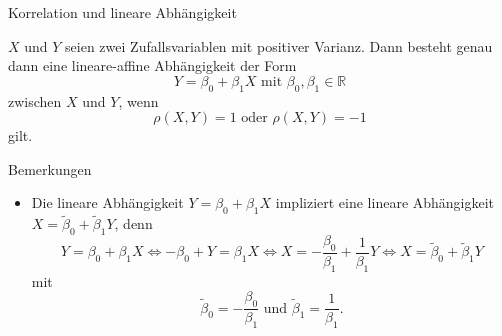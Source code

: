 \documentclass[
  8pt,
  ignorenonframetext,
]{beamer}
\providecommand{\tightlist}{%
  \setlength{\itemsep}{0pt}\setlength{\parskip}{0pt}}
\begin{document}
\begin{frame}{Korrelation und lineare Abhängigkeit}
\protect\hypertarget{korrelation-und-lineare-abhuxe4ngigkeit-1}{}
\small
\begin{theorem}
\justifying
\normalfont
$X$ und $Y$ seien zwei Zufallsvariablen mit positiver Varianz.  Dann besteht genau
dann eine lineare-affine Abhängigkeit der Form
\begin{equation}
Y = \beta_0 + \beta_1X \mbox{ mit } \beta_0,\beta_1\in \mathbb{R}
\end{equation}
zwischen $X$ und $Y$, wenn
\begin{equation}
\rho(X,Y) = 1 \mbox{ oder } \rho(X,Y) = -1
\end{equation}
gilt.
\end{theorem}

\footnotesize

Bemerkungen

\begin{itemize}
\tightlist
\item
  Die lineare Abhängigkeit \(Y = \beta_0 + \beta_1X\) impliziert eine
  lineare Abhängigkeit \(X = \tilde{\beta}_0 + \tilde{\beta}_1Y\), denn
  \begin{equation}
  Y = \beta_0 + \beta_1X
  \Leftrightarrow
  -\beta_0 + Y = \beta_1X
  \Leftrightarrow
  X = -\frac{\beta_0}{\beta_1} + \frac{1}{\beta_1}Y
  \Leftrightarrow
  X = \tilde{\beta}_0 + \tilde{\beta}_1 Y
  \end{equation} mit \begin{equation}
  \tilde{\beta}_0 = -\frac{\beta_0}{\beta_1} \mbox{ und } \tilde{\beta}_1 = \frac{1}{\beta_1}.
  \end{equation}
\end{itemize}
\end{frame}
\end{document}
